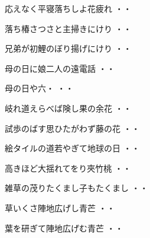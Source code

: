 \begin{shiika}応えなく平寝落ちしよ花疲れ
\hfill{・・}\end{shiika}
\vspace{0.6cm}
\begin{shiika}落ち椿さつさと主掃きにけり
\hfill{・・}\end{shiika}
\vspace{0.6cm}
\begin{shiika}兄弟が初鯉のぼり揚げにけり
\hfill{・・}\end{shiika}
\vspace{0.6cm}
\begin{shiika}母の日に娘二人の遠電話
\hfill{・・}\end{shiika}
\vspace{0.6cm}
\begin{shiika}母の日や六・
\hfill{・・}\end{shiika}
\vspace{0.6cm}
\begin{shiika}岐れ道えらべば険し果の余花
\hfill{・・}\end{shiika}
\vspace{0.6cm}
\begin{shiika}試歩のばす思ひたがわず藤の花
\hfill{・・}\end{shiika}
\vspace{0.6cm}
\begin{shiika}絵タイルの道若やぎて地球の日
\hfill{・・}\end{shiika}
\vspace{0.6cm}
\begin{shiika}高きほど大揺れてをり夾竹桃
\hfill{・・}\end{shiika}
\vspace{0.6cm}
\begin{shiika}雑草の茂りたくまし子もたくまし
\hfill{・・}\end{shiika}
\vspace{0.6cm}
\begin{shiika}草いくさ陣地広げし青芒
\hfill{・・}\end{shiika}
\vspace{0.6cm}
\begin{shiika}葉を研ぎて陣地広げむ青芒
\hfill{・・}\end{shiika}
